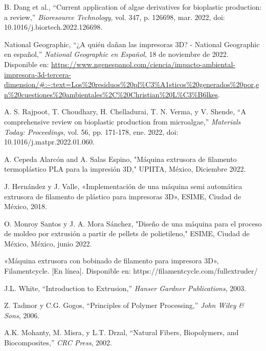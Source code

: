 \documentclass[14pt,oneside]{extarticle} %
\begin{document}
\begin{thebibliography}{5}

    B. Dang et al., 
    ``Current application of algae derivatives for bioplastic production: a review,'' 
    \textit{Bioresource Technology}, vol. 347, p. 126698, mar. 2022, 
    doi: 10.1016/j.biortech.2022.126698.

    National Geographic, 
    ``¿A quién dañan las impresoras 3D? - National Geographic en español,'' 
    \textit{National Geographic en Español}, 18 de noviembre de 2022. 
    Disponible en: \url{https://www.ngenespanol.com/ciencia/impacto-ambiental-impresora-3d-tercera-dimension/#:~:text=Los%20residuos%20pl%C3%A1sticos%20generados%20por,en%20cuestiones%20ambientales%2C%20Christian%20L%C3%B6lkes}.

    A. S. Rajpoot, T. Choudhary, H. Chelladurai, T. N. Verma, y V. Shende, 
    ``A comprehensive review on bioplastic production from microalgae,'' 
    \textit{Materials Today: Proceedings}, vol. 56, pp. 171-178, ene. 2022, 
    doi: 10.1016/j.matpr.2022.01.060.

    A. Cepeda Alarcón and A. Salas Espino, "Máquina extrusora de filamento termoplástico PLA para la impresión 3D," UPIITA, México, Diciembre 2022.

    J. Hernández y J. Valle, «Implementación de una máquina semi automática extrusora de filamento de plástico para impresoras 3D», ESIME, Ciudad de México, 2018.

    O. Monroy Santos y J. A. Mora Sánchez, "Diseño de una máquina para el proceso de moldeo por extrusión a partir de pellets de polietileno," ESIME, Ciudad de México, México, junio 2022.

    «Máquina extrusora con bobinado de filamento para impresora 3D», Filamentcycle. [En línea]. Disponible en: https://filamentcycle.com/fullextruder/

    J.L. White, 
    ``Introduction to Extrusion,'' 
    \textit{Hanser Gardner Publications}, 2003.

    Z. Tadmor y C.G. Gogos, 
    ``Principles of Polymer Processing,'' 
    \textit{John Wiley \& Sons}, 2006.

    A.K. Mohanty, M. Misra, y L.T. Drzal, 
    ``Natural Fibers, Biopolymers, and Biocomposites,'' 
    \textit{CRC Press}, 2002.


\end{thebibliography}
\end{document}
